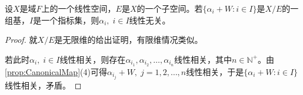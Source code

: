 \begin{corollary}\label{cor:A+WALinearIndependent}
	设$X$是域$F$上的一个线性空间，$E$是$X$的一个子空间。若$\{\alpha_i+W:i\in I\}$是$X/E$的一组基，$I$是一个指标集，则$\alpha_i,\;i\in I$线性无关。
\end{corollary}
\begin{proof}
	就$X/E$是无限维的给出证明，有限维情况类似。\par
	若此时$\alpha_i,\;i\in I$线性相关，则存在$\alpha_{i_1},\alpha_{i_2},\dots,\alpha_{i_n}$线性相关，其中$n\in \mathbb{N}^+$。由\cref{prop:CanonicalMap}(4)可得$\alpha_{i_j}+W,\;j=1,2,\dots,n$线性相关，于是$\{\alpha_i+W:i\in I\}$线性相关，矛盾。
\end{proof}
